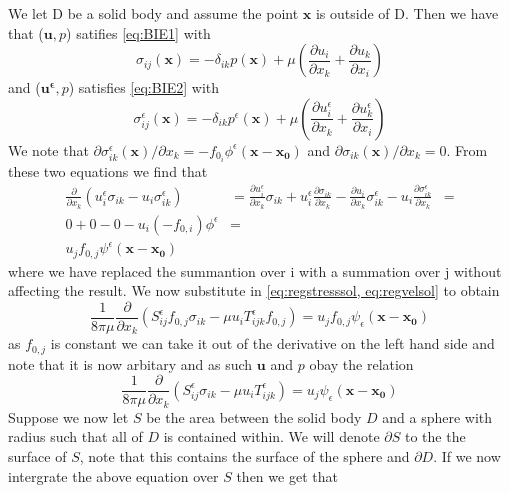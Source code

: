 We let D be a solid body and assume the point $\mathbf{x}$ is outside of D. Then we have that ($\mathbf{u},p$) satifies \cref{eq:BIE1} with
\begin{equation*}
\sigma_{ij}(\mathbf{x}) = -\delta_{ik}p(\mathbf{x}) + \mu\left( \frac{\partial u_i}{\partial x_k} + \frac{\partial u_k}{\partial x_i} \right)
\end{equation*}
and ($\mathbf{u^\epsilon},p$) satisfies \cref{eq:BIE2} with
\begin{equation*}
\sigma^\epsilon_{ij}(\mathbf{x}) = -\delta_{ik}p^\epsilon(\mathbf{x}) + \mu\left( \frac{\partial u^\epsilon_i}{\partial x_k} + \frac{\partial u^\epsilon_k}{\partial x_i} \right)
\end{equation*}
We note that $\partial \sigma^\epsilon_{ik}(\mathbf{x})/ \partial x_k = -f_{0_i}\phi^\epsilon(\mathbf{x}-\mathbf{x_0})$ and $\partial \sigma_{ik}(\mathbf{x})/ \partial x_k = 0$. From these two equations we find that
\begin{equation*}
\begin{aligned}
  \frac{\partial}{\partial x_k}(u^\epsilon_i\sigma_{ik} - u_i\sigma^\epsilon_{ik}) &=
  \frac{\partial u^\epsilon_i}{\partial x_k} \sigma_{ik} + u^\epsilon_i\frac{\partial \sigma_{ik}}{\partial x_k} - \frac{\partial u_i}{\partial x_k} \sigma^\epsilon_{ik} - u_i\frac{\partial \sigma^\epsilon_{ik}}{\partial x_k} &= \\
  0 + 0 - 0 - u_i(-f_{0,i})\phi^\epsilon &= \\
  u_j f_{0,j}\psi^\epsilon(\mathbf{x}-\mathbf{x_0})
\end{aligned}
\end{equation*}
where we have replaced the summantion over i with a summation over j without affecting the result.
We now substitute in \cref{eq:regstresssol, eq:regvelsol} to obtain
\begin{equation*}
  \frac{1}{8\pi\mu}\frac{\partial}{\partial x_k}(S^\epsilon_{ij}f_{0,j}\sigma_{ik} - \mu u_i T^\epsilon_{ijk}f_{0,j}) = u_j f_{0,j}\psi_\epsilon(\mathbf{x}-\mathbf{x_0})
\end{equation*}
as $f_{0,j}$ is constant we can take it out of the derivative on the left hand side and note that it is now arbitary and as such $\mathbf{u}$ and $p$ obay the relation
\begin{equation}
  \label{eq:reciprocalrelation}
  \frac{1}{8\pi\mu}\frac{\partial}{\partial x_k}(S^\epsilon_{ij}\sigma_{ik} - \mu u_i T^\epsilon_{ijk}) = u_j\psi_\epsilon(\mathbf{x}-\mathbf{x_0})
\end{equation}
Suppose we now let $S$ be the area between the solid body $D$ and a sphere with radius such that all of $D$ is contained within. We will denote $\partial S$ to the the surface of $S$, note that this contains the surface of the sphere and $\partial D$. If we now intergrate the above equation over $S$ then we get that
